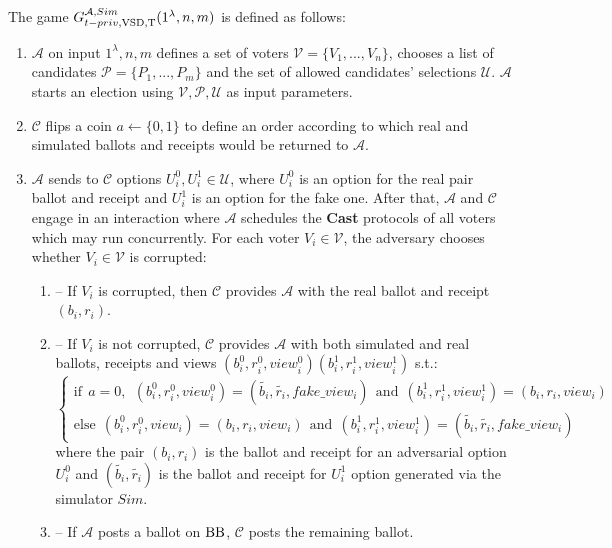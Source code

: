  
The game $G_{t-priv, \operatorname{VSD},\operatorname{T}}^{\mathcal{A},Sim}(1^{\lambda},n,m)$ is defined as follows:
\begin{enumerate} 
\item $\mathcal{A}$ on input $1^{\lambda},n,m$ defines a set of voters  $\mathcal{V} = \{V_1,...,V_n\}$, chooses a list of candidates  $\mathcal{P} = \{P_1,...,P_m\}$ and the set of allowed candidates' selections $\mathcal{U}$.  $\mathcal{A}$ starts an election using $\mathcal{V}, \mathcal{P}, \mathcal{U}$ as input parameters.
\item $\mathcal{C}$ flips a coin $a \leftarrow \{0,1\}$ to define an order according to which real and simulated ballots and receipts would be returned to $\mathcal{A}$.
\item   $\mathcal{A}$ sends to  $\mathcal{C}$ options $U_i^0, U_i^1 \in  \mathcal{U}$, where $U_i^0$ is an option for the real pair ballot and receipt and $U_i^1$ is an option for the fake one.  After that, $\mathcal{A}$ and $\mathcal{C}$ engage in an interaction where $\mathcal{A}$ schedules the \textbf{Cast}   protocols of all voters which may run concurrently. For each voter $V_i \in \mathcal{V}$, the adversary chooses whether $V_i \in \mathcal{V}$ is corrupted: 
\begin{enumerate}
\item[] -- If $V_i$ is corrupted, then $\mathcal{C}$ provides $\mathcal{A}$ with the real ballot and receipt $(b_i,r_i)$.
\item[] --  If $V_i$ is not corrupted, $\mathcal{C}$  provides $\mathcal{A}$ with both simulated and real ballots, receipts and views $(b_i^0, r_i^0,view_i^0) (b_i^1, r_i^1,view_i^1)$ s.t.:\\
$ \begin{cases}
 \text{if} ~~a =0,~~ (b_i^0,r_i^0,view_i^0) = (\tilde{b_i},\tilde{r_i},fake\_view_i) ~~ \text{and} ~~  (b_i^1,r_i^1,view_i^1) = (b_i,r_i,view_i)   \\ 
 \text{else}~~ (b_i^0,r_i^0,view_i) =(b_i,r_i,view_i)~~  \text{and} ~~  (b_i^1,r_i^1,view_i^1) =(\tilde{b_i},\tilde{r_i},fake\_view_i)
\end{cases}$\\ 
where the pair $(b_i, r_i)$ is the ballot and receipt for an adversarial option $U_i^0$ and $(\tilde{b_i},\tilde{r_i})$ is the ballot and receipt for  $U_i^1$ option generated via the simulator $Sim$.
\item[] --  If  $\mathcal{A}$ posts a ballot on $\operatorname{BB}$, $\mathcal{C}$ posts the remaining ballot. 
\end{enumerate}

\end{enumerate}
